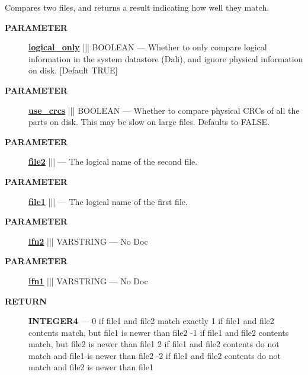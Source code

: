 \par





Compares two files, and returns a result indicating how well they match.






\par
\begin{description}
\item [\colorbox{tagtype}{\color{white} \textbf{\textsf{PARAMETER}}}] \textbf{\underline{logical\_only}} ||| BOOLEAN --- Whether to only compare logical information in the system datastore (Dali), and ignore physical information on disk. [Default TRUE]
\item [\colorbox{tagtype}{\color{white} \textbf{\textsf{PARAMETER}}}] \textbf{\underline{use\_crcs}} ||| BOOLEAN --- Whether to compare physical CRCs of all the parts on disk. This may be slow on large files. Defaults to FALSE.
\item [\colorbox{tagtype}{\color{white} \textbf{\textsf{PARAMETER}}}] \textbf{\underline{file2}} |||  --- The logical name of the second file.
\item [\colorbox{tagtype}{\color{white} \textbf{\textsf{PARAMETER}}}] \textbf{\underline{file1}} |||  --- The logical name of the first file.
\item [\colorbox{tagtype}{\color{white} \textbf{\textsf{PARAMETER}}}] \textbf{\underline{lfn2}} ||| VARSTRING --- No Doc
\item [\colorbox{tagtype}{\color{white} \textbf{\textsf{PARAMETER}}}] \textbf{\underline{lfn1}} ||| VARSTRING --- No Doc
\end{description}







\par
\begin{description}
\item [\colorbox{tagtype}{\color{white} \textbf{\textsf{RETURN}}}] \textbf{INTEGER4} --- 0 if file1 and file2 match exactly 1 if file1 and file2 contents match, but file1 is newer than file2 -1 if file1 and file2 contents match, but file2 is newer than file1 2 if file1 and file2 contents do not match and file1 is newer than file2 -2 if file1 and file2 contents do not match and file2 is newer than file1
\end{description}




